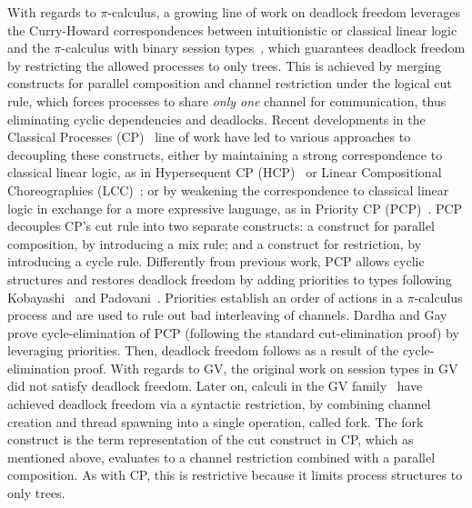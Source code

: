 \documentclass[main.tex]{subfiles}
\begin{document}
With regards to $\pi$-calculus, a growing line of work on deadlock freedom leverages the Curry-Howard correspondences between intuitionistic or classical linear logic and the $\pi$-calculus with binary session types~\cite{cairespfenning10,wadler14}, which guarantees deadlock freedom by restricting the allowed processes to only trees. This is achieved by merging constructs for parallel composition and channel restriction under the logical cut rule, which forces processes to share \emph{only one} channel for communication, thus eliminating cyclic dependencies and deadlocks. Recent developments in the Classical Processes (CP)~\cite{wadler14} line of work have led to various approaches to decoupling these constructs, either by maintaining a strong correspondence to classical linear logic, as in Hypersequent CP (HCP)~\cite{kokkemontesi19popl,kokkemontesi19tlla} or Linear Compositional Choreographies (LCC)~\cite{CarboneMS18}; or by weakening the correspondence to classical linear logic in exchange for a more expressive language, as in Priority CP (PCP)~\cite{dardhagay18}. PCP decouples CP's cut rule into two separate constructs: a construct for parallel composition, by introducing a mix rule; and a construct for restriction, by introducing a cycle rule. Differently from previous work, PCP allows cyclic structures and restores deadlock freedom by adding priorities to types following Kobayashi~\cite{kobayashi06} and Padovani~\cite{padovani14}. Priorities establish an order of actions in a $\pi$-calculus process and are used to rule out bad interleaving of channels. Dardha and Gay prove cycle-elimination of PCP (following the standard cut-elimination proof) by leveraging priorities. Then, deadlock freedom follows as a result of the cycle-elimination proof.
%
With regards to GV, the original work on session types in GV~\cite{gayvasconcelos12} did not satisfy deadlock freedom. Later on, calculi in the GV family~\cite{wadler15,lindleymorris15} have achieved deadlock freedom via a syntactic restriction, \ie by combining channel creation and thread spawning into a single operation, called fork. The fork construct is the term representation of the cut construct in CP, which as mentioned above, evaluates to a channel restriction combined with a parallel composition. As with CP, this is restrictive because it limits process structures to only trees.
\end{document}
